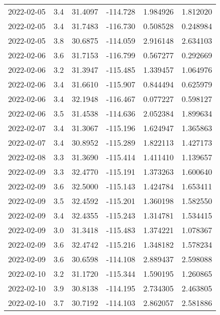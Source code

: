 \begin{tabular}{lrrrrr}
2022-02-05 &       3.4 &  31.4097 &  -114.728 &         1.984926 &         1.812020 \\
2022-02-05 &       3.4 &  31.7483 &  -116.730 &         0.508528 &         0.248984 \\
2022-02-05 &       3.8 &  30.6875 &  -114.059 &         2.916148 &         2.634103 \\
2022-02-06 &       3.6 &  31.7153 &  -116.799 &         0.567277 &         0.292669 \\
2022-02-06 &       3.2 &  31.3947 &  -115.485 &         1.339457 &         1.064976 \\
2022-02-06 &       3.4 &  31.6610 &  -115.907 &         0.844494 &         0.625979 \\
2022-02-06 &       3.4 &  32.1948 &  -116.467 &         0.077227 &         0.598127 \\
2022-02-06 &       3.5 &  31.4538 &  -114.636 &         2.052384 &         1.899634 \\
2022-02-07 &       3.4 &  31.3067 &  -115.196 &         1.624947 &         1.365863 \\
2022-02-07 &       3.4 &  30.8952 &  -115.289 &         1.822113 &         1.427173 \\
2022-02-08 &       3.3 &  31.3690 &  -115.414 &         1.411410 &         1.139657 \\
2022-02-09 &       3.3 &  32.4770 &  -115.191 &         1.373263 &         1.600640 \\
2022-02-09 &       3.6 &  32.5000 &  -115.143 &         1.424784 &         1.653411 \\
2022-02-09 &       3.5 &  32.4592 &  -115.201 &         1.360198 &         1.582550 \\
2022-02-09 &       3.4 &  32.4355 &  -115.243 &         1.314781 &         1.534415 \\
2022-02-09 &       3.0 &  31.3418 &  -115.483 &         1.374221 &         1.078367 \\
2022-02-09 &       3.6 &  32.4742 &  -115.216 &         1.348182 &         1.578234 \\
2022-02-09 &       3.6 &  30.6598 &  -114.108 &         2.889437 &         2.598088 \\
2022-02-10 &       3.2 &  31.1720 &  -115.344 &         1.590195 &         1.260865 \\
2022-02-10 &       3.9 &  30.8138 &  -114.195 &         2.734305 &         2.463805 \\
2022-02-10 &       3.7 &  30.7192 &  -114.103 &         2.862057 &         2.581886 \\

\end{tabular}
